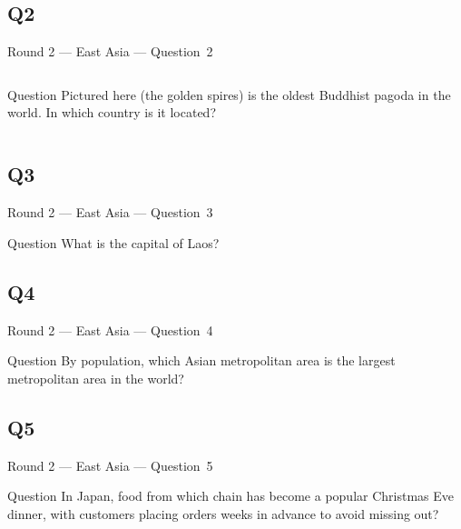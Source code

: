 \documentclass[11pt]{beamer}
\begin{document}
\subsection*{Q2}
\begin{frame}[t]{Round 2 --- East Asia --- \mbox{Question 2}}
\vspace{-0.5em}
\begin{columns}[T,totalwidth=\linewidth]
\begin{column}{0.32\linewidth}
\begin{block}{Question}
Pictured here (the golden spires) is the oldest Buddhist pagoda in the world.  In which country is it located?
\end{block}
\end{column}
\begin{column}{0.65\linewidth}
\begin{center}
\texttt{[image: \{Images/yangon]}.jpg}
\end{center}
\end{column}
\end{columns}
\end{frame}
\subsection*{Q3}
\begin{frame}[t]{Round 2 --- East Asia --- \mbox{Question 3}}
\vspace{-0.5em}
\begin{block}{Question}
What is the capital of Laos?
\end{block}
\end{frame}
\subsection*{Q4}
\begin{frame}[t]{Round 2 --- East Asia --- \mbox{Question 4}}
\vspace{-0.5em}
\begin{block}{Question}
By population, which Asian metropolitan area is the largest metropolitan area in the world?
\end{block}
\end{frame}
\subsection*{Q5}
\begin{frame}[t]{Round 2 --- East Asia --- \mbox{Question 5}}
\vspace{-0.5em}
\begin{block}{Question}
In Japan, food from which chain has become a popular Christmas Eve dinner, with customers placing orders weeks in advance to avoid missing out?
\end{block}
\end{frame}
\end{document}
